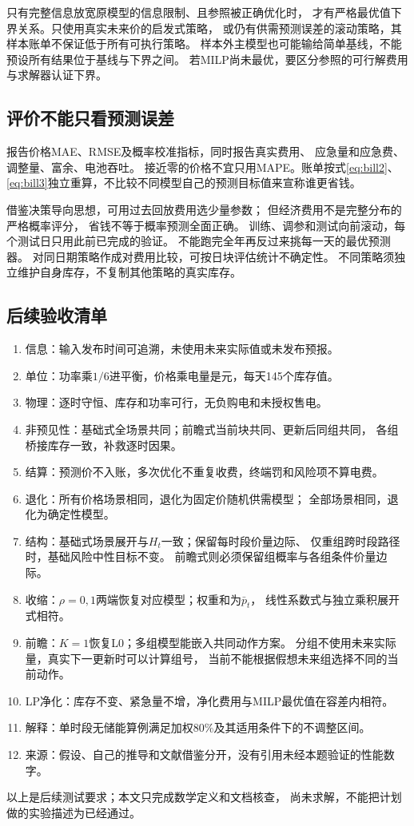 \documentclass[UTF8,11pt]{ctexart}
\begin{document}
只有完整信息放宽原模型的信息限制、且参照被正确优化时，
才有严格最优值下界关系。只使用真实未来价的启发式策略，
或仍有供需预测误差的滚动策略，其样本账单不保证低于所有可执行策略。
样本外主模型也可能输给简单基线，不能预设所有结果位于基线与下界之间。
若MILP尚未最优，要区分参照的可行解费用与求解器认证下界。

\subsection{评价不能只看预测误差}
报告价格MAE、RMSE及概率校准指标，同时报告真实费用、
应急量和应急费、调整量、富余、电池吞吐。
接近零的价格不宜只用MAPE。账单按式\eqref{eq:bill2}、
\eqref{eq:bill3}独立重算，不比较不同模型自己的预测目标值来宣称谁更省钱。

借鉴决策导向思想\cite{elmachtoub2022}，可用过去回放费用选少量参数；
但经济费用不是完整分布的严格概率评分\cite{hirsch2026}，
省钱不等于概率预测全面正确。
训练、调参和测试向前滚动，每个测试日只用此前已完成的验证。
不能跑完全年再反过来挑每一天的最优预测器。
对同日期策略作成对费用比较，可按日块评估统计不确定性。
不同策略须独立维护自身库存，不复制其他策略的真实库存。

\subsection{后续验收清单}
\begin{enumerate}
 \item 信息：输入发布时间可追溯，未使用未来实际值或未发布预报。
 \item 单位：功率乘$1/6$进平衡，价格乘电量是元，每天145个库存值。
 \item 物理：逐时守恒、库存和功率可行，无负购电和未授权售电。
 \item 非预见性：基础式全场景共同；前瞻式当前块共同、更新后同组共同，
       各组桥接库存一致，补救逐时因果。
 \item 结算：预测价不入账，多次优化不重复收费，终端罚和风险项不算电费。
 \item 退化：所有价格场景相同，退化为固定价随机供需模型；
       全部场景相同，退化为确定性模型。
 \item 结构：基础式场景展开与$H_t$一致；保留每时段价量边际、
       仅重组跨时段路径时，基础风险中性目标不变。
       前瞻式则必须保留组概率与各组条件价量边际。
 \item 收缩：$\rho=0,1$两端恢复对应模型；权重和为$\bar p_t$，
       线性系数式与独立乘积展开式相符。
 \item 前瞻：$K=1$恢复L0；多组模型能嵌入共同动作方案。
       分组不使用未来实际量，真实下一更新时可以计算组号，
       当前不能根据假想未来组选择不同的当前动作。
 \item LP净化：库存不变、紧急量不增，净化费用与MILP最优值在容差内相符。
 \item 解释：单时段无储能算例满足加权80\%及其适用条件下的不调整区间。
 \item 来源：假设、自己的推导和文献借鉴分开，没有引用未经本题验证的性能数字。
\end{enumerate}
以上是后续测试要求；本文只完成数学定义和文档核查，
尚未求解，不能把计划做的实验描述为已经通过。
\end{document}
